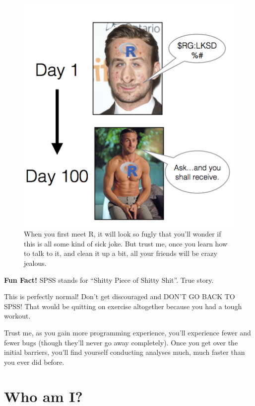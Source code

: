 \documentclass[]{book}
\begin{document}
\begin{figure}

{\centering \includegraphics{images/gosling} 

}

\caption{When you first meet R, it will look so fugly that you'll wonder if this is all some kind of sick joke. But trust me, once you learn how to talk to it, and clean it up a bit, all your friends will be crazy jealous.}\label{fig:unnamed-chunk-5}
\end{figure}

\textbf{Fun Fact!} SPSS stands for ``Shitty Piece of Shitty Shit''. True
story.

This is perfectly normal! Don't get discouraged and DON'T GO BACK TO
SPSS! That would be quitting on exercise altogether because you had a
tough workout.

Trust me, as you gain more programming experience, you'll experience
fewer and fewer bugs (though they'll never go away completely). Once you
get over the initial barriers, you'll find yourself conducting analyses
much, much faster than you ever did before.

\section{Who am I?}\label{who-am-i}
\end{document}
